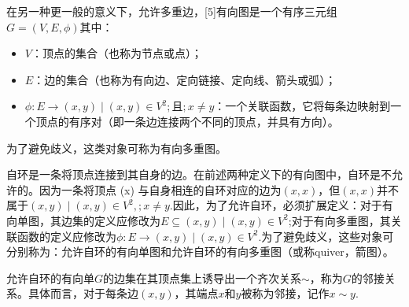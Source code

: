 在另一种更一般的意义下，允许多重边，[5]有向图是一个有序三元组$G = (V, E, \phi)$其中：
\begin{itemize}
\item $V$：顶点的集合（也称为节点或点）；
\item $E$：边的集合（也称为有向边、定向链接、定向线、箭头或弧）；
\item $\phi : E \to {(x,y) \mid (x,y) \in V^{2} ;\text{且}; x \neq y}$：一个关联函数，它将每条边映射到一个顶点的有序对（即一条边连接两个不同的顶点，并具有方向）。
\end{itemize}
为了避免歧义，这类对象可称为有向多重图。

自环是一条将顶点连接到其自身的边。在前述两种定义下的有向图中，自环是不允许的。因为一条将顶点 (x) 与自身相连的自环对应的边为$(x,x)$，但$(x,x)$并不属于${(x,y)\mid (x,y)\in V^{2}, ; x \neq y}$.因此，为了允许自环，必须扩展定义：对于有向单图，其边集的定义应修改为$E \subseteq {(x,y)\mid (x,y)\in V^{2}}$;对于有向多重图，其关联函数的定义应修改为$\phi : E \to {(x,y)\mid (x,y)\in V^{2}}$.为了避免歧义，这些对象可分别称为：允许自环的有向单图和允许自环的有向多重图（或称quiver，箭图）。

允许自环的有向单$G$的边集在其顶点集上诱导出一个齐次关系$\sim$，称为$G$的邻接关系。具体而言，对于每条边$(x,y)$，其端点$x$和$y$被称为邻接，记作$x \sim y$.


